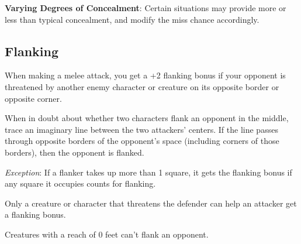 \textbf{Varying Degrees of Concealment}: Certain situations may provide more or less than typical concealment, and modify the miss chance accordingly.
				
\subsection{Flanking}

				
When making a melee attack, you get a +2 flanking bonus if your opponent is threatened by another enemy character or creature on its opposite border or opposite corner.
				
When in doubt about whether two characters flank an opponent in the middle, trace an imaginary line between the two attackers' centers. If the line passes through opposite borders of the opponent's space (including corners of those borders), then the opponent is flanked.
				
\textit{Exception}: If a flanker takes up more than 1 square, it gets the flanking bonus if any square it occupies counts for flanking.
				
Only a creature or character that threatens the defender can help an attacker get a flanking bonus.
				
Creatures with a reach of 0 feet can't flank an opponent.

